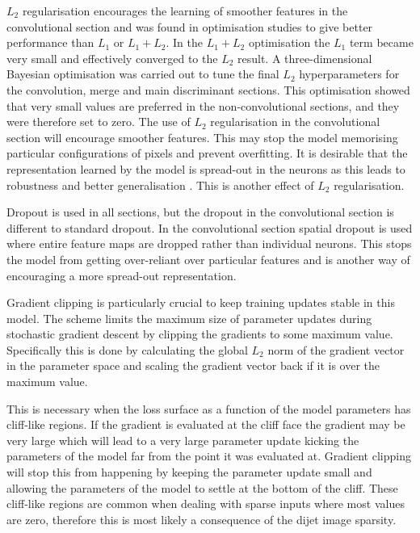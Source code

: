 $L_2$ regularisation encourages the learning of smoother features in the convolutional section and was found in optimisation studies to give better performance than $L_1$ or $L_1 + L_2$. 
In the $L_1 + L_2$ optimisation the $L_1$ term became very small and effectively converged to the $L_2$ result.
A three-dimensional Bayesian optimisation was carried out to tune the final $L_2$ hyperparameters for the convolution, merge and main discriminant sections.
This optimisation showed that very small values are preferred in the non-convolutional sections, and they were therefore set to zero. 
The use of $L_2$ regularisation in the convolutional section will encourage smoother features. This may stop the model memorising particular configurations of pixels and prevent overfitting. 
It is desirable that the representation learned by the model is spread-out in the neurons as this leads to robustness and better generalisation \cite{DeepMindDeletion}.
This is another effect of $L_2$ regularisation.

Dropout is used in all sections, but the dropout in the convolutional section is different to standard dropout. 
In the convolutional section spatial dropout is used where entire feature maps are dropped rather than individual neurons. 
This stops the model from getting over-reliant over particular features and is another way of encouraging a more spread-out representation. 


Gradient clipping is particularly crucial to keep training updates stable in this model. 
The scheme limits the maximum size of parameter updates during stochastic gradient descent by clipping the gradients to some maximum value. 
Specifically this is done by calculating the global $L_2$ norm of the gradient vector in the parameter space and scaling the gradient vector back if it is over the maximum value.  

This is necessary when the loss surface as a function of the model parameters has cliff-like regions. If the gradient is evaluated at the cliff face the gradient may be very large which will lead to a very large parameter update kicking the parameters of the model far from the point it was evaluated at. Gradient clipping will stop this from happening by keeping the parameter update small and allowing the parameters of the model to settle at the bottom of the cliff. These cliff-like regions are common when dealing with sparse inputs where most values are zero, therefore this is most likely a consequence of the dijet image sparsity. 



